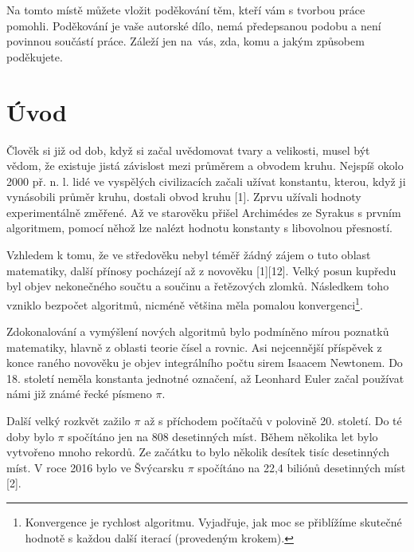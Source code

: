 \documentclass[rocnikovka]{gzwroc} %
\begin{document}
\titulnistrana %
\prohlaseni %
\podekovani %
Na tomto místě můžete vložit poděkování těm, kteří vám s tvorbou práce pomohli. Poděkování je vaše autorské dílo, nemá předepsanou podobu a není povinnou součástí práce. Záleží jen na~vás, zda, komu a jakým způsobem poděkujete.
\newpage %
\vyrobanotaci %
\tableofcontents %
\newpage %
\section{Úvod} %
Člověk si již od dob, když si začal uvědomovat tvary a velikosti, musel být vědom, že existuje jistá závislost mezi průměrem a obvodem kruhu. Nejspíš okolo 2000 př. n. l.  lidé ve vyspělých civilizacích začali užívat konstantu, kterou, když ji vynásobili průměr kruhu, dostali obvod kruhu [1].
Zprvu užívali hodnoty experimentálně změřené. Až ve starověku přišel Archimédes ze Syrakus s prvním algoritmem, pomocí něhož lze nalézt hodnotu konstanty s libovolnou přesností.

Vzhledem k tomu, že ve středověku nebyl téměř žádný zájem o tuto oblast matematiky, další přínosy pocházejí až z novověku [1][12]. Velký posun kupředu byl objev nekonečného součtu a součinu a řetězových zlomků. Následkem toho vzniklo bezpočet algoritmů, nicméně většina měla pomalou konvergenci\footnote[1]{Konvergence je rychlost algoritmu. Vyjadřuje, jak moc se přiblížíme skutečné hodnotě s každou další iterací (provedeným krokem).}.

Zdokonalování a vymýšlení nových algoritmů bylo podmíněno mírou poznatků matematiky, hlavně z oblasti teorie čísel a rovnic. Asi nejcennější příspěvek z konce raného novověku je objev integrálního počtu sirem Isaacem Newtonem. Do 18. století neměla konstanta jednotné označení, až Leonhard Euler začal používat námi již známé řecké písmeno $\pi$.

Další velký rozkvět zažilo $\pi$ až s příchodem počítačů v polovině 20. století. Do té doby bylo $\pi$ spočítáno jen na 808 desetinných míst. Během několika let bylo vytvořeno mnoho rekordů. Ze začátku to bylo několik desítek tisíc desetinných míst. V roce 2016 bylo ve Švýcarsku $\pi$ spočítáno na 22,4 biliónů desetinných míst [2].
\end{document}
